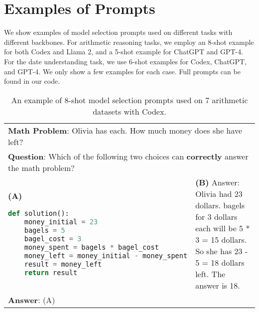 \documentclass[11pt]{article}
\begin{document}
\section{Examples of Prompts} \label{app:prompt_example}
We show examples of model selection prompts used on different tasks with different backbones. For arithmetic reasoning tasks, we employ an 8-shot example for both Codex and Llama 2, and a 5-shot example for ChatGPT and GPT-4. For the date understanding task, we use 6-shot examples for Codex, ChatGPT, and GPT-4. We only show a few examples for each case. Full prompts can be found in our code.
\begin{table*}[h]
    \centering
    \begin{tabular}{p{}|p{}}
    \toprule
     \multicolumn{2}{p{0.92\textwidth}}{\small \textbf{Math Problem}: Olivia has \3 each. How much money does she have left?} \\
      \multicolumn{2}{p{0.92\textwidth}}{\small \textbf{Question}:  Which of the following two choices can \textbf{correctly} answer the math problem?} \\
     
    \midrule

    \small \textbf{(A)} 
    \lstset{style=mystyle}
     \begin{lstlisting}[language=Python]
def solution():
    money_initial = 23
    bagels = 5
    bagel_cost = 3
    money_spent = bagels * bagel_cost
    money_left = money_initial - money_spent
    result = money_left
    return result
     \end{lstlisting} 
&
    \small \textbf{(B)} \newline
    \newline
    \small Answer: \newline
     \small  Olivia had 23 dollars. \newline
     5 bagels for 3 dollars each will be 5 * 3 = 15 dollars. \newline
     So she has 23 - 5 = 18 dollars left. \newline
     The answer is 18.\\
     \midrule

      \multicolumn{2}{p{0.92\textwidth}}{\small \textbf{Answer}: (A)}
\\
     \bottomrule
    \end{tabular}
    \caption{An example of 8-shot model selection prompts used on 7 arithmetic datasets with Codex.}

    \label{tab:codex_example_math}
\end{table*}
\end{document}
